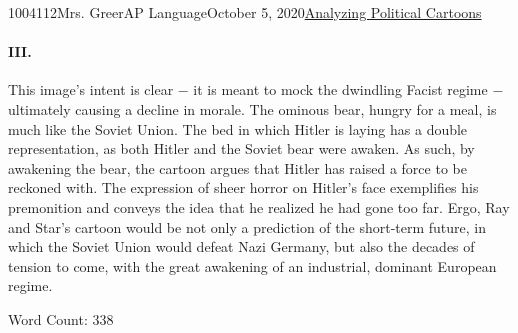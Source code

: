 \documentclass[12pt,letterpaper]{article}
\begin{document}
\begin{mla}{1004112}{}{Mrs. Greer}{AP Language}{October 5, 2020}{\underline{Analyzing Political Cartoons}}
\begin{justifying}
    \paragraph{III.} This image's intent is clear $-$ it is meant to mock the dwindling Facist regime $-$ ultimately causing a decline in morale. The ominous bear, hungry for a meal, is much like the Soviet Union. The bed in which Hitler is laying has a double representation, as both Hitler and the Soviet bear were awaken. As such, by awakening the bear, the cartoon argues that Hitler has raised a force to be reckoned with. The expression of sheer horror on Hitler's face exemplifies his premonition and conveys the idea that he realized he had gone too far. Ergo, Ray and Star's cartoon would be not only a prediction of the short-term future, in which the Soviet Union would defeat Nazi Germany, but also the decades of tension to come, with the great awakening of an industrial, dominant European regime.


\end{justifying}
\centering Word Count: 338

\end{mla}
\end{document}
